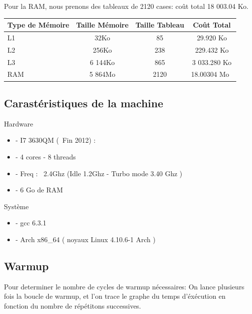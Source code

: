 \documentclass{report}
\begin{document}
Pour la RAM, nous prenons des tableaux de 2120 cases: coût total 18 003.04 Ko.

\begin{tabular}{ l c | c c }
    Type de Mémoire & Taille Mémoire & Taille Tableau & Coût Total\\\hline
    L1 & 32Ko & 85 & 29.920 Ko\\ 
    L2 & 256Ko & 238 & 229.432 Ko \\
    L3 & 6 144Ko & 865 & 3 033.280 Ko \\
    RAM & 5 864Mo & 2120 & 18.00304 Mo \\
\end{tabular}

\subsection*{Carastéristiques de la machine}

Hardware
\begin{itemize}
    \item{- I7 3630QM (~Fin 2012) :}
    \item{- 4 cores - 8 threads}
    \item{- Freq : ~2.4Ghz (Idle 1.2Ghz - Turbo mode 3.40 Ghz )}
    \item{- 6 Go de RAM }
\end{itemize}

Système
\begin{itemize}
    \item{- gcc 6.3.1}
    \item{- Arch x86\_64 ( noyaux Linux 4.10.6-1 Arch )}
\end{itemize}

\subsection*{Warmup}



Pour determiner le nombre de cycles de warmup nécessaires: On lance plusieurs fois la boucle de warmup, et l'on trace le graphe du temps d'éxécution en fonction du nombre de répétitons successives.
\end{document}

